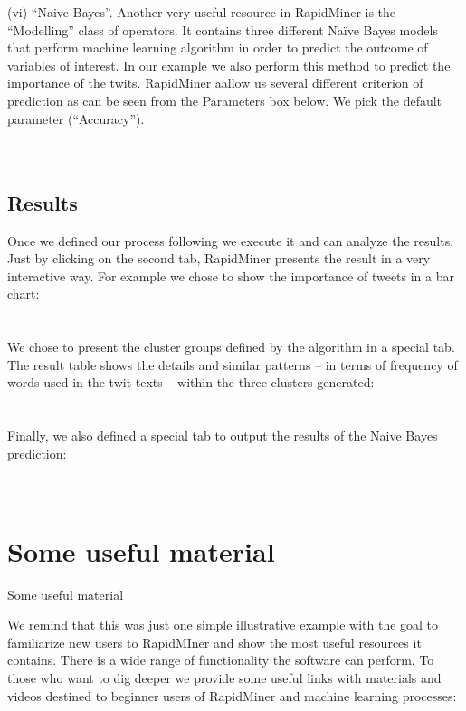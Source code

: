 \documentclass[12pt]{article}
\begin{document}
(vi)	“Naive Bayes”. Another very useful resource in RapidMiner is the “Modelling” class of operators. It contains three different Naïve Bayes models that perform machine learning algorithm in order to predict the outcome of variables of interest. In our example we also perform this method to predict the importance of the twits. RapidMiner aallow us several different criterion of prediction as can be seen from the Parameters box below. We pick the default parameter (“Accuracy”).\\
\\
[FIGURE 5] \\


\subsection{Results}

Once we defined our process following we execute it and can analyze the results. Just by clicking on the second tab, RapidMiner presents the result in a very interactive way. For example we chose to show the importance of tweets in a bar chart: \\
\\
[FIGURE 6] \\

We chose to present the cluster groups defined by the algorithm in a special tab. The result table shows the details and similar patterns – in terms of frequency of words used in the twit texts – within the three clusters generated: \\
\\
[FIGURE 5] \\

Finally, we also defined a special tab to output the results of the Naive Bayes prediction: \\
\\
[FIGURE 8] \\

\section{Some useful material}

Some useful material 

We remind that this was just one simple illustrative example with the goal to familiarize new users to RapidMIner and show the most useful resources it contains. There is a wide range of functionality the software can perform. To those who want to dig deeper we provide some useful links with materials and videos destined to beginner users of RapidMiner and machine learning processes: \newline
\end{document}
